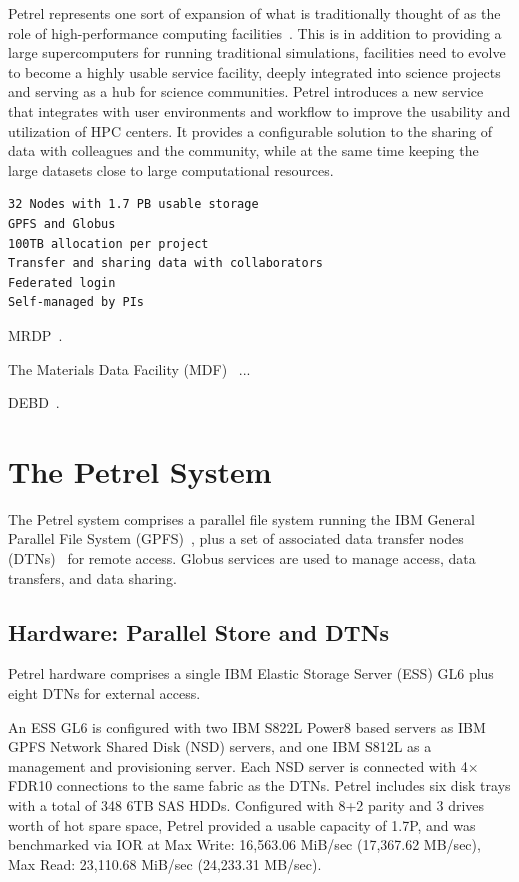 \documentclass[sigconf]{acmart}
\begin{document}
Petrel represents one sort of expansion of what is traditionally thought of as the role of high-performance computing facilities~\cite{UrPa16}. 
This is in addition to providing a large supercomputers for running traditional simulations, facilities need to evolve to become a highly usable service facility, deeply integrated into science projects and serving as a hub for science communities. 
Petrel introduces a new service that integrates with user environments and workflow to improve the usability and utilization of HPC centers. 
It provides a configurable solution to the sharing of data with colleagues and the community, 
while at the  same time keeping the large datasets close to large computational resources.



\begin{verbatim}
32 Nodes with 1.7 PB usable storage
GPFS and Globus
100TB allocation per project
Transfer and sharing data with collaborators
Federated login
Self-managed by PIs
\end{verbatim}

MRDP~\cite{BMRDP}.

The Materials Data Facility (MDF)~\cite{MDF2016} ...

DEBD~\cite{foster2015networking}.


\section{The Petrel System}

The Petrel system comprises a parallel file system running the
IBM General Parallel File System (GPFS)~\cite{schmuck2002gpfs},
plus a set of associated data transfer nodes (DTNs)~\cite{dart2014science} for remote access. 
Globus services are used to manage access, data transfers, and data sharing.

\subsection{Hardware: Parallel Store and DTNs}

Petrel hardware comprises a single IBM Elastic Storage Server (ESS) GL6 plus eight DTNs for external access.

An ESS GL6 is configured with two IBM S822L Power8 based servers as IBM GPFS Network Shared Disk (NSD) servers, and one IBM S812L as a management and provisioning server. 
Each NSD server is connected with 4$\times$FDR10 connections to the same fabric as the DTNs. 
Petrel includes six disk trays with a total of 348 6TB SAS HDDs. 
Configured with 8+2 parity and 3 drives worth of hot spare space, Petrel provided a usable capacity of 1.7P, and was benchmarked via IOR at Max Write: 16,563.06 MiB/sec (17,367.62 MB/sec), Max Read:  23,110.68 MiB/sec (24,233.31 MB/sec).
\end{document}
